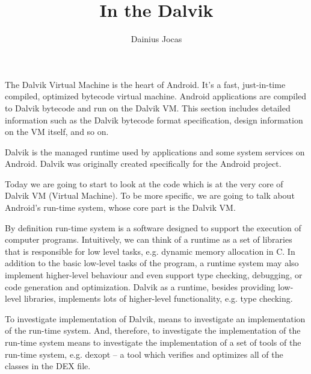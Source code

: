 \documentclass[11pt,a4paper]{article}
\author{Dainius Jocas}
\title{In the Dalvik}
\begin{document}
\maketitle

The Dalvik Virtual Machine is the heart of Android. It's a fast, just-in-time compiled, optimized bytecode virtual machine. Android applications are compiled to Dalvik bytecode and run on the Dalvik VM. This section includes detailed information such as the Dalvik bytecode format specification, design information on the VM itself, and so on.

Dalvik is the managed runtime used by applications and some system services on Android. Dalvik was originally created specifically for the Android project.

Today we are going to start to look at the code which is at the very core of Dalvik VM (Virtual Machine). To be more specific, we are going to talk about Android's run-time system, whose core part is the Dalvik VM. 

By definition run-time system is a software designed to support the execution of computer programs. Intuitively, we can think of a runtime as a set of libraries that is responsible for low level tasks, e.g. dynamic memory allocation in C. In addition to the basic low-level tasks of the program, a runtime system may also implement higher-level behaviour and even support type checking, debugging, or code generation and optimization. Dalvik as a runtime, besides providing low-level libraries, implements lots of higher-level functionality, e.g. type checking.

To investigate implementation of Dalvik, means to investigate an implementation of the run-time system. And, therefore, to investigate the implementation of the run-time system means to investigate the implementation of a set of tools of the run-time system, e.g. dexopt -- a tool which verifies and optimizes all of the classes in the DEX file.
\end{document}
